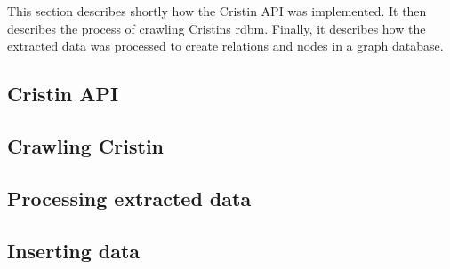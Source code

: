 This section describes shortly how the Cristin API was implemented. It then describes the process of crawling Cristins rdbm. Finally, it describes how the extracted data was processed to create relations and nodes in a graph database.

\subsection*{Cristin API}

\subsection*{Crawling Cristin}

\subsection*{Processing extracted data}

\subsection*{Inserting data}
